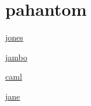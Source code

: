 \section{pahantom}


\href{http://camltastic.blogspot.com/2008/05/phantom-types.html}{jones}

\href{http://www.quora.com/What-are-good-applications-of-phantom-types}{jambo}

\href{http://caml.inria.fr/pub/ml-archives/caml-list/2001/09/081c77179ee2a3787233902a51633122.en.html}{caml}

\href{https://ocaml.janestreet.com/?q=node/11}{jane}

